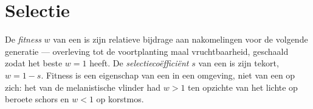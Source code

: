 \section{Selectie}

\begin{definition}[Fitness]\label{def:b2:population-genetics:fitness}
De \emph{fitness} $w$ van een  is zijn relatieve bijdrage aan
nakomelingen voor de volgende generatie --- overleving tot de voortplanting
maal vruchtbaarheid, geschaald zodat het beste  $w = 1$ heeft. De
\emph{selectiecoëfficiënt} $s$ van een  is zijn tekort,
$w = 1 - s$. Fitness is een eigenschap van een  in een omgeving,
niet van een  op zich: het  van de melanistische vlinder had $w > 1$
ten opzichte van het lichte op beroete schors en $w < 1$ op korstmos.
\end{definition}

